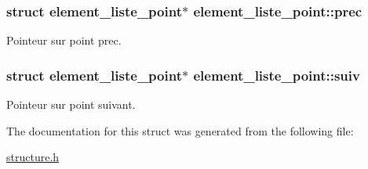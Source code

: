 \subsubsection[{\texorpdfstring{prec}{prec}}]{\setlength{\rightskip}{0pt plus 5cm}struct {\bf element\+\_\+liste\+\_\+point}$\ast$ element\+\_\+liste\+\_\+point\+::prec}\hypertarget{structelement__liste__point_ab018ca42acbb6b97e2eeea9b98a2e4d0}{}\label{structelement__liste__point_ab018ca42acbb6b97e2eeea9b98a2e4d0}
Pointeur sur point prec. 
\subsubsection[{\texorpdfstring{suiv}{suiv}}]{\setlength{\rightskip}{0pt plus 5cm}struct {\bf element\+\_\+liste\+\_\+point}$\ast$ element\+\_\+liste\+\_\+point\+::suiv}\hypertarget{structelement__liste__point_ae93ea1296e301ab4aa7a362b677a3c49}{}\label{structelement__liste__point_ae93ea1296e301ab4aa7a362b677a3c49}
Pointeur sur point suivant. 

The documentation for this struct was generated from the following file\+:\begin{DoxyCompactItemize}
\item 
\hyperlink{structure_8h}{structure.\+h}\end{DoxyCompactItemize}

